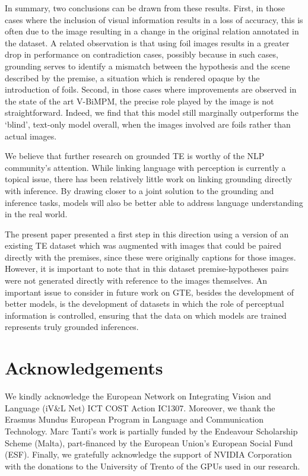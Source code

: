 \documentclass[11pt]{article}
\begin{document}
In summary, two conclusions can be drawn from these results. First, in those cases where the inclusion of visual information results in a loss of accuracy, this is often due to the image resulting in a change in the original relation annotated in the dataset. A related observation is that using foil images results in a greater drop in performance on contradiction cases, possibly because in such cases, grounding serves to identify a mismatch between the hypothesis and the scene described by the premise, a situation which is rendered opaque by the introduction of foils. Second, in those cases where improvements are observed in the state of the art V-BiMPM, the precise role played by the image is not straightforward. Indeed, we find that this model still marginally outperforms the `blind', text-only model overall, when the images involved are foils rather than actual images.

We believe that further research on grounded TE is worthy of the NLP community's attention. While linking language with perception is currently a topical issue, there has been relatively little work on linking grounding directly with inference. By drawing closer to a joint solution to the  grounding and inference tasks, models will also be better able to address language understanding in the real world. 

The present paper presented a first step in this direction using a version of an existing TE dataset which was augmented with images that could be paired directly with the premises, since these were originally captions for those images. However, it is important to note that in this dataset premise-hypotheses pairs were not generated directly with reference to the images themselves. An important issue to consider in future work on GTE, besides the development of better models, is the development of datasets in which the role of perceptual information is controlled, ensuring that the data on which models are trained represents truly grounded inferences.

 
\section*{Acknowledgements}
 We kindly acknowledge the European Network on Integrating Vision and Language (iV\&L Net) ICT COST Action IC1307. Moreover, we thank the Erasmus Mundus European Program in Language and Communication Technology. Marc Tanti's work is partially funded by the Endeavour Scholarship Scheme (Malta),  part-financed by the European Union's European Social Fund (ESF). Finally, we gratefully acknowledge the support of NVIDIA Corporation with the donations to the University of Trento of the GPUs used in our research.
\end{document}
